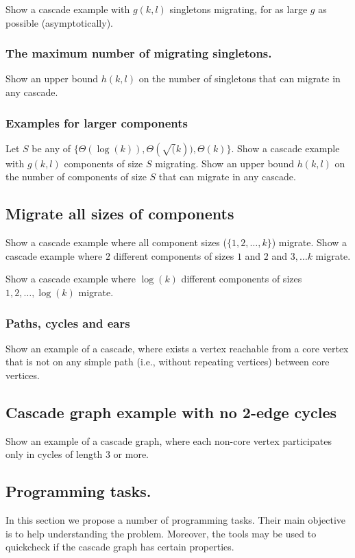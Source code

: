 \documentclass[a4paper,USenglish]{lipics-v2019}
\begin{document}
Show a cascade example with $g(k,l)$ singletons migrating, for as large $g$ as possible (asymptotically).

\subsubsection{The maximum number of migrating singletons.}

Show an upper bound $h(k,l)$ on the number of singletons that can migrate in any cascade.

\subsubsection{Examples for larger components }

Let $S$ be any of $\{ \Theta(\log(k)), \Theta(\sqrt(k)), \Theta(k)\}$.
Show a cascade example with $g(k,l)$ components of size $S$ migrating.
Show an upper bound $h(k,l)$ on the number of components of size $S$ that can migrate in any cascade.

\subsection{Migrate all sizes of components}

Show a cascade example where all component sizes ($\{1,2, \ldots, k\}$) migrate.
Show a cascade example where $2$ different components of sizes $1$ and $2$ and $3,\ldots k$ migrate.

Show a cascade example where $\log(k)$ different components of sizes $1, 2, \ldots, \log(k)$ migrate.

\subsubsection{Paths, cycles and ears}


Show an example of a cascade, where exists a vertex reachable from a core vertex that is not on any simple path (i.e., without repeating vertices) between core vertices.

\subsection{Cascade graph example with no 2-edge cycles}

Show an example of a cascade graph, where each non-core vertex participates only in cycles of length $3$ or more.


\subsection{Programming tasks.}
In this section we propose a number of programming tasks. Their main objective
is to help understanding the problem. Moreover, the tools may be used to quickcheck 
if the cascade graph has certain properties.
\end{document}
